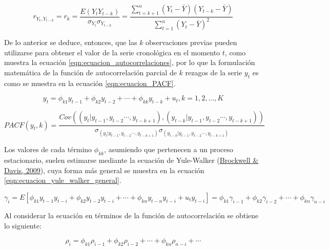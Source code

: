 \documentclass[
]{article}
\begin{document}
\begin{equation}
\label{eqn:pearson_adaptada_autocorrelacion}
r_{{Y_t},{Y_{t-k}}} = r_k = \frac{E({Y_t}{Y_{t-k}})}{\sigma_{Y_t} \sigma_{Y_{t-k}}} = \frac{\sum_{t=k+1}^n \left({Y_t} - \bar{Y} \right) \left({Y_{t-k}} - \bar{Y}\right)}{ \sum_{t=1}^n \left({Y_t} - \bar{Y} \right)^2}
\end{equation}

De lo anterior se deduce, entonces, que las \(k\) observaciones previas
pueden utilizarse para obtener el valor de la serie cronológica en el
momento \(t\), como muestra la ecuación
\eqref{eqn:ecuacion_autocorrelaciones}, por lo que la formulación
matemática de la función de autocorrelación parcial de \(k\) rezagos de
la serie \(y_t\) es como se muestra en la ecuación
\eqref{eqn:ecuacion_PACF}.

\begin{equation}
\label{eqn:ecuacion_autocorrelaciones}
y_t=\phi_{k1}y_{t-1}+\phi_{k2}y_{t-2}+\cdots+\phi_{kk}y_{t-k}+u_t,k=1,2,...,K
\end{equation}

\begin{equation}
\label{eqn:ecuacion_PACF}
PACF(y_t,k)=\frac{Cov\left(\left(y_t|y_{t-1},y_{t-2}\cdots,y_{t-k+1}\right),\left(y_{t-k}|y_{t-1},y_{t-2}\cdots,y_{t-k+1}\right)\right)}{\sigma_{\left(y_t|y_{t-1},y_{t-2}\cdots,y_{t-k+1}\right)}\sigma_{\left(y_{t-k}|y_{t-1},y_{t-2}\cdots,y_{t-k+1}\right)}}
\end{equation}

Los valores de cada término \(\phi_{kk}\), asumiendo que pertenecen a un
proceso estacionario, suelen estimarse mediante la ecuación de
Yule-Walker (\protect\hyperlink{ref-yule.walker}{Brockwell \& Davis,
2009}), cuya forma más general se muestra en la ecuación
\eqref{eqn:ecuacion_yule_walker_general}.

\begin{equation}
\label{eqn:ecuacion_yule_walker_general}
\gamma_i=E\left[ \phi_{k1}y_{t-1}y_{t-i} + \phi_{k2}y_{t-2}y_{t-i} + \cdots + \phi_{kn}y_{t-n}y_{t-i} + u_ty_{t-i} \right]=\phi_{k1}\gamma_{i-1} + \phi_{k2}\gamma_{i-2} + \cdots + \phi_{kn}\gamma_{n-i}
\end{equation}

Al considerar la ecuación en términos de la función de autocorrelación
se obtiene lo siguiente:

\begin{equation}
\label{eqn:ecuacion_yule_walker_autocorrelacion}
\rho_i=\phi_{k1}\rho_{i-1} + \phi_{k2}\rho_{i-2} + \cdots + \phi_{kn}\rho_{n-i}+\cdots
\end{equation}
\end{document}
